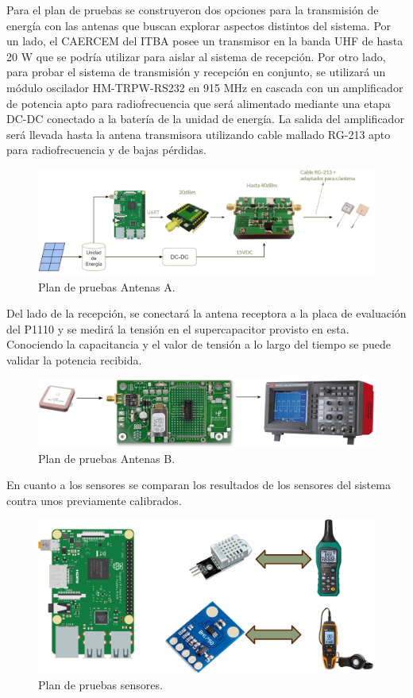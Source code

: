 Para el plan de pruebas se construyeron dos opciones para la transmisión de energía con las antenas que buscan explorar aspectos distintos del sistema. Por un lado, el CAERCEM del ITBA posee un transmisor en la banda UHF de hasta 20 W que se podría utilizar para aislar al sistema de recepción. Por otro lado, para probar el sistema de transmisión y recepción en conjunto, se utilizará un módulo oscilador HM-TRPW-RS232 en 915 MHz en cascada con un amplificador de potencia apto para radiofrecuencia que será alimentado mediante una etapa DC-DC conectado a la batería de la unidad de energía. La salida del amplificador será llevada hasta la antena transmisora utilizando cable mallado RG-213 apto para radiofrecuencia y de bajas pérdidas.
\begin{figure}[H]
	\centering
	\includegraphics[width=0.9\linewidth]{ImagenesIngenieria de Detalle/planDePruebasAntenasA}	
	\caption{Plan de pruebas Antenas A.}
	\label{fig:planDePruebasAntenasA}
\end{figure}

Del lado de la recepción, se conectará la antena receptora a la placa de evaluación del P1110 y se medirá la tensión en el supercapacitor provisto en esta. Conociendo la capacitancia y el valor de tensión a lo largo del tiempo se puede validar la potencia recibida.
\begin{figure}[H]
	\centering
	\includegraphics[width=0.8\linewidth]{ImagenesIngenieria de Detalle/planDePruebasAntenasB}	
	\caption{Plan de pruebas Antenas B.}
	\label{fig:planDePruebasAntenasB}
\end{figure}

En cuanto a los sensores se comparan los resultados de los sensores del sistema contra unos previamente calibrados.
\begin{figure}[H]
	\centering
	\includegraphics[width=0.8\linewidth]{ImagenesIngenieria de Detalle/planDePruebasSensores}	
	\caption{Plan de pruebas sensores.}
	\label{fig:planDePruebasSensores}
\end{figure}